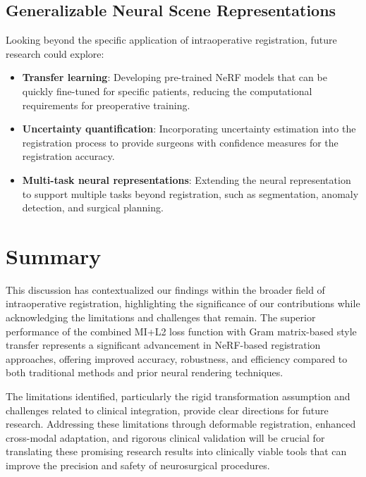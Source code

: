 \subsection{Generalizable Neural Scene Representations}

Looking beyond the specific application of intraoperative registration, future research could explore:

\begin{itemize}
    \item \textbf{Transfer learning}: Developing pre-trained NeRF models that can be quickly fine-tuned for specific patients, reducing the computational requirements for preoperative training.
    
    \item \textbf{Uncertainty quantification}: Incorporating uncertainty estimation into the registration process to provide surgeons with confidence measures for the registration accuracy.
    
    \item \textbf{Multi-task neural representations}: Extending the neural representation to support multiple tasks beyond registration, such as segmentation, anomaly detection, and surgical planning.
\end{itemize}

\section{Summary}

This discussion has contextualized our findings within the broader field of intraoperative registration, highlighting the significance of our contributions while acknowledging the limitations and challenges that remain. The superior performance of the combined MI+L2 loss function with Gram matrix-based style transfer represents a significant advancement in NeRF-based registration approaches, offering improved accuracy, robustness, and efficiency compared to both traditional methods and prior neural rendering techniques.

The limitations identified, particularly the rigid transformation assumption and challenges related to clinical integration, provide clear directions for future research. Addressing these limitations through deformable registration, enhanced cross-modal adaptation, and rigorous clinical validation will be crucial for translating these promising research results into clinically viable tools that can improve the precision and safety of neurosurgical procedures. 